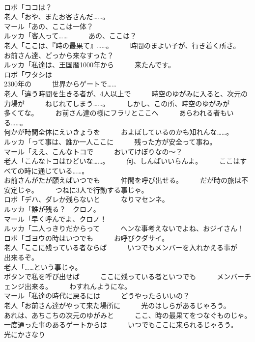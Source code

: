 \documentclass[8pt]{extreport}
\begin{document}
\begin{CJK}{UTF8}{min}
\\	ロボ「ココは？	
\\	老人「おや、またお客さんだ……。	
\\	マール「あの、ここは一体？	
\\	ルッカ「客人って……　　　あの、ここは？	
\\	老人「ここは、『時の最果て』……。　　　時間のまよい子が、行き着く所さ。　　　お前さん達、どっから来なすった？	
\\	ルッカ「私達は、王国暦1000年から　　　来たんです。	
\\	ロボ「ワタシは
\\	2300年の　　　世界からゲートで……	
\\	老人「違う時間を生きる者が、4人以上で　　　時空のゆがみに入ると、次元の力場が　　　ねじれてしまう……。　　　しかし、この所、時空のゆがみが　　　多くてな。　　　お前さん達の様にフラリとここへ　　　あらわれる者もいる……。	
\\	何かが時間全体にえいきょうを　　　およぼしているのかも知れんな……。	
\\	ルッカ「って事は、誰か一人ここに　　　残った方が安全って事ね。	
\\	マール「ええ、こんなトコで　　　おいてけぼりなの～？	
\\	老人「こんなトコはひどいな……。　　　何、しんぱいいらんよ。　　　ここはすべての時に通じている……。	
\\	お前さんがたが願えばいつでも　　　仲間を呼び出せる。　　　だが時の旅は不安定じゃ。　　　つねに3人で行動する事じゃ。	
\\	ロボ「デハ、ダレか残らないと　　　なりマセンネ。	
\\	ルッカ「誰が残る？　クロノ。	
\\	マール「早く呼んでよ、クロノ！	
\\	ルッカ「二人っきりだからって　　　ヘンな事考えないでよね、おジイさん！	
\\	ロボ「ゴヨウの時はいつでも　　　お呼びクダサイ。	
\\	老人「ここに残っている者ならば　　　いつでもメンバーを入れかえる事が　　　出来るぞ。	
\\	老人「……という事じゃ。	
\\	ボタンで私を呼び出せば　　　ここに残っている者といつでも　　　メンバーチェンジ出来る。　　　わすれんようにな。	
\\	マール「私達の時代に戻るには　　　どうやったらいいの？	
\\	老人「お前さん達がやって来た場所に　　　光のはしらがあるじゃろう。　　　あれは、あちこちの次元のゆがみと　　　ここ、時の最果てをつなぐものじゃ。　　　一度通った事のあるゲートからは　　　いつでもここに来られるじゃろう。　　　光にかさなり

\end{CJK}
\end{document}
